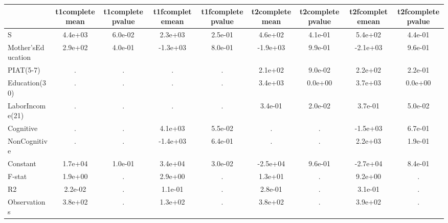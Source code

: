 \begin{table}[htbp]
\begin{tabular}{lcccccccc} \hline \hline
 & t1completemean  & t1completepvalue  & t1fcompletemean  & t1fcompletepvalue  & t2completemean  & t2completepvalue  & t2fcompletemean  & t2fcompletepvalue  \\  \hline 
S &  4.4e+03 &  6.0e-02 &  2.3e+03 &  2.5e-01 &  4.6e+02 &  4.1e-01 &  5.4e+02 &  4.4e-01 \\  
Mother'sEducation &  2.9e+02 &  4.0e-01 & -1.3e+03 &  8.0e-01 & -1.9e+03 &  9.9e-01 & -2.1e+03 &  9.6e-01 \\  
PIAT(5-7) &         . &         . &         . &         . &  2.1e+02 &  9.0e-02 &  2.2e+02 &  2.2e-01 \\  
Education(30) &         . &         . &         . &         . &  3.4e+03 &  0.0e+00 &  3.7e+03 &  0.0e+00 \\  
LaborIncome(21) &         . &         . &         . &         . &  3.4e-01 &  2.0e-02 &  3.7e-01 &  5.0e-02 \\  
Cognitive &         . &         . &  4.1e+03 &  5.5e-02 &         . &         . & -1.5e+03 &  6.7e-01 \\  
NonCognitive &         . &         . & -1.4e+03 &  6.4e-01 &         . &         . &  2.2e+03 &  1.9e-01 \\  
Constant &  1.7e+04 &  1.0e-01 &  3.4e+04 &  3.0e-02 & -2.5e+04 &  9.6e-01 & -2.7e+04 &  8.4e-01 \\  
F-stat &  1.9e+00 &         . &  2.9e+00 &         . &  1.3e+01 &         . &  9.2e+00 &         . \\  
R2 &  2.2e-02 &         . &  1.1e-01 &         . &  2.8e-01 &         . &  3.1e-01 &         . \\  
Observations &  3.8e+02 &         . &  1.3e+02 &         . &  3.8e+02 &         . &  3.9e+02 &         . \\  
\hline \hline \end{tabular}
\end{table}
